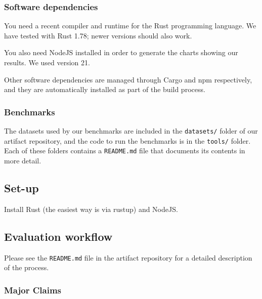 \documentclass[sigplan,10pt]{acmart}
\begin{document}
\subsubsection{Software dependencies}

You need a recent compiler and runtime for the Rust programming language. We have tested with Rust 1.78; newer versions should also work.

You also need NodeJS installed in order to generate the charts showing our results. We used version 21.

Other software dependencies are managed through Cargo and npm respectively, and they are automatically installed as part of the build process.

\subsubsection{Benchmarks}

The datasets used by our benchmarks are included in the \texttt{datasets/} folder of our artifact repository, and the code to run the benchmarks is in the \texttt{tools/} folder.
Each of these folders contains a \texttt{README.md} file that documents its contents in more detail.

\subsection{Set-up}

Install Rust (the easiest way is via rustup) and NodeJS.

\subsection{Evaluation workflow}

Please see the \texttt{README.md} file in the artifact repository for a detailed description of the process.

\subsubsection{Major Claims}


\end{document}
